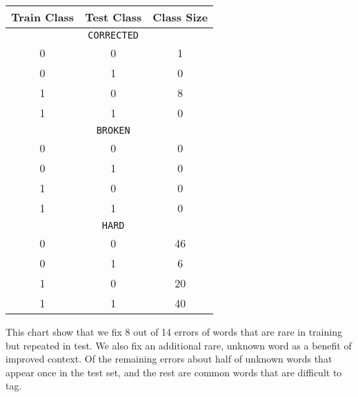 \documentclass{article}
\begin{document}
\begin{center}
  \begin{tabular}{|ccc|}
    \hline

    Train Class  & Test Class  & Class Size \\
    \hline
    \hline
    & \texttt{CORRECTED}  &\\
    0&0& 1 \\   
    0& 1  &0 \\   
    1& 0&  8   \\ 
    1& 1&  0\\
    \hline   
    & \texttt{BROKEN} &\\
    0& 0&  0   \\ 
    0& 1&  0    \\
    1& 0&  0 \\   
    1& 1&  0\\
    \hline   
    &\texttt{HARD} &\\
    0& 0&  46 \\  
    0& 1&  6    \\
    1& 0&  20   \\
    1& 1&  40   \\
    \hline 
  \end{tabular}  
\end{center}

This chart show that  we fix 8 out of 14 errors of words that are rare in training but repeated in test. We also fix an additional rare, unknown word as a benefit of improved context. Of the remaining errors about half of unknown words that appear once in the test set, and the rest are common words that are difficult to tag.   
\end{document}
